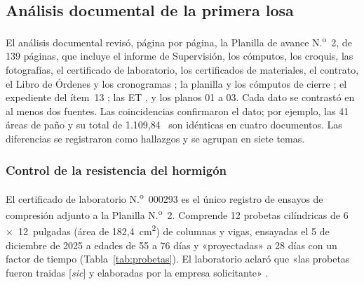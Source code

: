 \subsection{Análisis documental de la primera losa}
\label{sec:analisis-documental}

El análisis documental revisó, página por página, la Planilla de avance N.\textsuperscript{o}~2, de 139 páginas, que incluye el informe de Supervisión, los cómputos, los croquis, las fotografías, el certificado de laboratorio, los certificados de materiales, el contrato, el Libro de Órdenes y los cronogramas \parencite{uatf2025pao2}; la planilla y los cómputos de cierre \parencite{uatf_pao3}; el expediente del ítem~13 \parencite{uatf_item13}; las ET \parencite{uatf_et}, y los planos 01 a 03. Cada dato se contrastó en al menos dos fuentes. Las coincidencias confirmaron el dato; por ejemplo, las 41 áreas de paño y su total de 1.109,84~\mdos{} son idénticas en cuatro documentos. Las diferencias se registraron como hallazgos y se agrupan en siete temas.

\subsubsection{Control de la resistencia del hormigón}
El certificado de laboratorio N.\textsuperscript{o}~000293 es el único registro de ensayos de compresión adjunto a la Planilla N.\textsuperscript{o}~2. Comprende 12 probetas cilíndricas de 6~$\times$~12~pulgadas (área de 182,4~cm\textsuperscript{2}) de columnas y vigas, ensayadas el 5 de diciembre de 2025 a edades de 55 a 76 días y «proyectadas» a 28 días con un factor de tiempo (Tabla~\ref{tab:probetas}). El laboratorio aclaró que «las probetas fueron traidas [\textit{sic}] y elaboradas por la empresa solicitante» \parencite[p.~78]{uatf2025pao2}.

